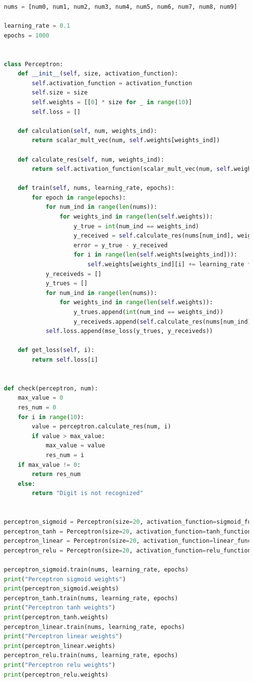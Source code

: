 \documentclass[a4paper, 14pt]{extarticle}
\begin{document}
\begin{lstlisting}[language={python},caption={Однослойный персептрон},label={lst:code1}]
nums = [num0, num1, num2, num3, num4, num5, num6, num7, num8, num9]

learning_rate = 0.1
epochs = 1000


class Perceptron:
    def __init__(self, size, activation_function):
        self.activation_function = activation_function
        self.size = size
        self.weights = [[0] * size for _ in range(10)]
        self.loss = []

    def calculation(self, num, weights_ind):
        return scalar_mult_vec(num, self.weights[weights_ind])

    def calculate_res(self, num, weights_ind):
        return self.activation_function(scalar_mult_vec(num, self.weights[weights_ind]))

    def train(self, nums, learning_rate, epochs):
        for epoch in range(epochs):
            for num_ind in range(len(nums)):
                for weights_ind in range(len(self.weights)):
                    y_true = int(num_ind == weights_ind)
                    y_received = self.calculate_res(nums[num_ind], weights_ind)
                    error = y_true - y_received
                    for i in range(len(self.weights[weights_ind])):
                        self.weights[weights_ind][i] += learning_rate * nums[num_ind][i] * error
            y_receiveds = []
            y_trues = []
            for num_ind in range(len(nums)):
                for weights_ind in range(len(self.weights)):
                    y_trues.append(int(num_ind == weights_ind))
                    y_receiveds.append(self.calculate_res(nums[num_ind], weights_ind))
            self.loss.append(mse_loss(y_trues, y_receiveds))

    def get_loss(self, i):
        return self.loss[i]


def check(perceptron, num):
    max_value = 0
    res_num = 0
    for i in range(10):
        value = perceptron.calculate_res(num, i)
        if value > max_value:
            max_value = value
            res_num = i
    if max_value != 0:
        return res_num
    else:
        return "Digit is not recognized"


perceptron_sigmoid = Perceptron(size=20, activation_function=sigmoid_function)
perceptron_tanh = Perceptron(size=20, activation_function=tanh_function)
perceptron_linear = Perceptron(size=20, activation_function=linear_function)
perceptron_relu = Perceptron(size=20, activation_function=relu_function)

perceptron_sigmoid.train(nums, learning_rate, epochs)
print("Perceptron sigmoid weights")
print(perceptron_sigmoid.weights)
perceptron_tanh.train(nums, learning_rate, epochs)
print("Perceptron tanh weights")
print(perceptron_tanh.weights)
perceptron_linear.train(nums, learning_rate, epochs)
print("Perceptron linear weights")
print(perceptron_linear.weights)
perceptron_relu.train(nums, learning_rate, epochs)
print("Perceptron relu weights")
print(perceptron_relu.weights)


\end{lstlisting}
\end{document}
